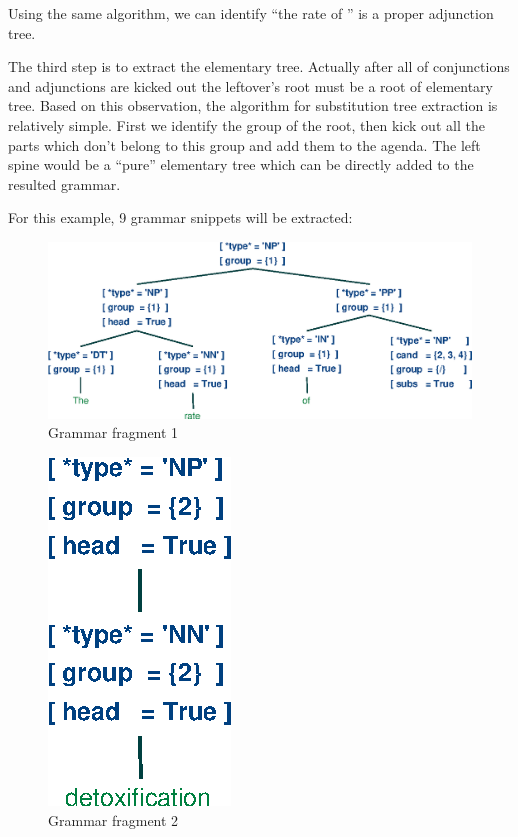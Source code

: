 \documentclass[a4paper]{article}
\begin{document}
Using the same algorithm, we can identify ``the rate of '' is a proper adjunction tree.

The third step is to extract the elementary tree. Actually after all of conjunctions and adjunctions are kicked out the leftover's root must be a root of elementary tree. Based on this observation, the algorithm for substitution tree extraction is relatively simple. First we identify the group of the root, then kick out all the parts which don't belong to this group and add them to the agenda. The left spine would be a ``pure'' elementary tree which can be directly added to the resulted grammar.

For this example, 9 grammar snippets will be extracted:

\begin{figure}[h]
    \begin{center}
        \includegraphics[scale=0.5]{1.eps}
    \end{center}
    \caption{Grammar fragment 1}
\end{figure}
\begin{figure}[h]
    \begin{center}
        \includegraphics[scale=0.5]{2.eps}
    \end{center}
    \caption{Grammar fragment 2}
\end{figure}
\end{document}
